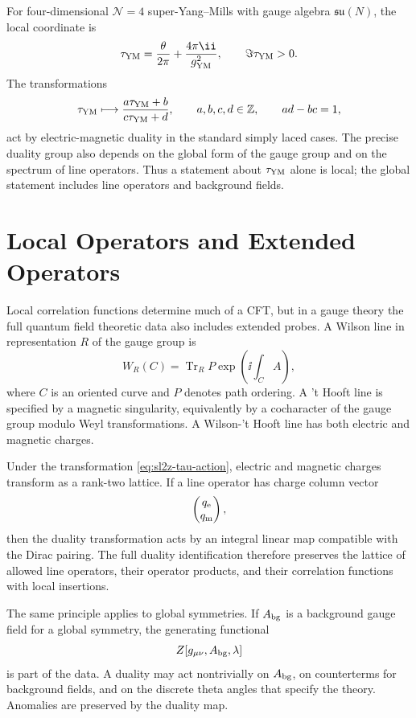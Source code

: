 For four-dimensional \(\mathcal N=4\) super-Yang--Mills with gauge algebra
\(\mathfrak{su}(N)\), the local coordinate is
\[
  \tau_{\rm YM}
  =
  \frac{\theta}{2\pi}
  +
  \frac{4\pi\ii}{g_{\rm YM}^2},
  \qquad
  \Im\tau_{\rm YM}>0.
\]
The transformations
\begin{equation}
  \tau_{\rm YM}
  \longmapsto
  \frac{a\tau_{\rm YM}+b}{c\tau_{\rm YM}+d},
  \qquad
  a,b,c,d\in\mathbb Z,
  \qquad
  ad-bc=1,
  \label{eq:sl2z-tau-action}
\end{equation}
act by electric-magnetic duality in the standard simply laced cases.  The
precise duality group also depends on the global form of the gauge group and
on the spectrum of line operators.  Thus a statement about
\(\tau_{\rm YM}\) alone is local; the global statement includes line
operators and background fields.

\section{Local Operators and Extended Operators}

Local correlation functions determine much of a CFT, but in a gauge theory
the full quantum field theoretic data also includes extended probes.  A Wilson
line in representation \(R\) of the gauge group is
\[
  W_R(C)
  =
  \operatorname{Tr}_R
  P\exp\left(\ii\int_C A\right),
\]
where \(C\) is an oriented curve and \(P\) denotes path ordering.  A
't Hooft line is specified by a magnetic singularity, equivalently by a
cocharacter of the gauge group modulo Weyl transformations.  A Wilson-'t
Hooft line has both electric and magnetic charges.

Under the transformation \eqref{eq:sl2z-tau-action}, electric and magnetic
charges transform as a rank-two lattice.  If a line operator has charge column
vector
\[
  \begin{pmatrix} q_{\rm e}\\ q_{\rm m}\end{pmatrix},
\]
then the duality transformation acts by an integral linear map compatible with
the Dirac pairing.  The full duality identification therefore preserves the
lattice of allowed line operators, their operator products, and their
correlation functions with local insertions.

The same principle applies to global symmetries.  If \(A_{\rm bg}\) is a
background gauge field for a global symmetry, the generating functional
\[
  Z[g_{\mu\nu},A_{\rm bg},\lambda]
\]
is part of the data.  A duality may act nontrivially on \(A_{\rm bg}\), on
counterterms for background fields, and on the discrete theta angles that
specify the theory.  Anomalies are preserved by the duality map.

